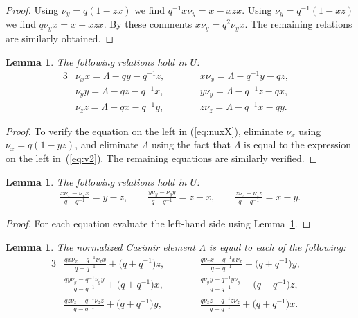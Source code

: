 \documentclass[11pt]{article}
\numberwithin{equation}{section}
\newtheorem{Lemma}[Theorem]{Lemma}
\begin{document}
\begin{proof}
Using $\nu_y = q(1-zx)$ we f\/ind
$q^{-1}x \nu_y=x-xzx$.
Using $\nu_y= q^{-1}(1-xz)$ we f\/ind
$q\nu_y x = x - xzx$. By these comments
$x \nu_y = q^2 \nu_y x$. The remaining
relations are similarly obtained.
\end{proof}

\begin{Lemma}
\label{lem:xvx}
The following relations hold in
$U$:
\begin{alignat}{3}
& \nu_x x = \Lambda - q y - q^{-1}z,
\qquad &&
x\nu_x = \Lambda - q^{-1}y - qz, &
\label{eq:nuxX}
\\
& \nu_y y = \Lambda - q z - q^{-1}x,
\qquad &&
y\nu_y = \Lambda - q^{-1}z - qx,&
\label{eq:nuyY}
\\
& \nu_z z = \Lambda - q x - q^{-1}y,
\qquad &&
z\nu_z = \Lambda - q^{-1}x - qy.&
\label{eq:nuzZ}
\end{alignat}
\end{Lemma}

\begin{proof}
To
verify the equation on
the left in
(\ref{eq:nuxX}), eliminate
$\nu_x$ using $\nu_x = q(1-yz)$, and eliminate
$\Lambda$
using the fact that $\Lambda$ is equal to
the expression on the left in~(\ref{eq:v2}).
 The remaining equations are
similarly verif\/ied.
\end{proof}


\begin{Lemma}
\label{lem:xnxcom}
The following relations hold in
$U$:
\begin{gather*}
\frac{x\nu_x-\nu_x x}{q-q^{-1}}  =  y-z,
\qquad
\frac{y\nu_y-\nu_y y}{q-q^{-1}}  =  z-x,
\qquad
\frac{z\nu_z-\nu_z z}{q-q^{-1}}  =  x-y.
\end{gather*}
\end{Lemma}

\begin{proof}
For each equation evaluate the left-hand side
using
Lemma~\ref{lem:xvx}.
\end{proof}




\begin{Lemma}
The normalized Casimir element $\Lambda$ is equal
to each of the following:
\begin{alignat}{3}
&\frac{qx \nu_x - q^{-1}\nu_x x}{q-q^{-1}}+\big(q+q^{-1}\big)z,
\qquad &&
\frac{q \nu_x x - q^{-1}x\nu_x}{q-q^{-1}}+\big(q+q^{-1}\big)y,&
\label{eq:dcas1}
\\
&\frac{qy \nu_y - q^{-1}\nu_y y}{q-q^{-1}}+\big(q+q^{-1}\big)x,
\qquad &&
\frac{q \nu_y y - q^{-1}y\nu_y}{q-q^{-1}}+\big(q+q^{-1}\big)z, &
\label{eq:dcas2}
\\
& \frac{qz \nu_z - q^{-1}\nu_z z}{q-q^{-1}}+\big(q+q^{-1}\big)y,
\qquad &&
\frac{q \nu_z z - q^{-1}z\nu_z}{q-q^{-1}}+\big(q+q^{-1}\big)x.&
\label{eq:dcas3}
\end{alignat}
\end{Lemma}
\end{document}

